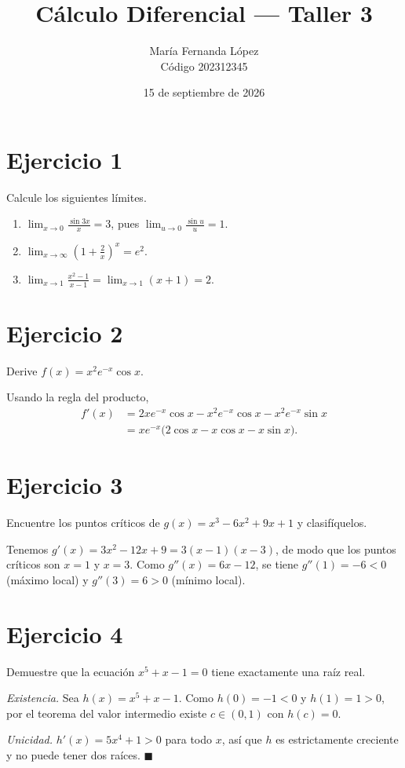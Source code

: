 \documentclass[11pt]{article}
\title{Cálculo Diferencial --- Taller 3}
\author{María Fernanda López \\ Código 202312345}
\date{15 de septiembre de 2026}
\begin{document}
\maketitle

\section*{Ejercicio 1}
Calcule los siguientes límites.
\begin{enumerate}[label=\alph*)]
  \item $\displaystyle\lim_{x\to 0} \frac{\sin 3x}{x} = 3$, pues $\lim_{u\to0}\frac{\sin u}{u}=1$.
  \item $\displaystyle\lim_{x\to\infty} \left(1+\frac{2}{x}\right)^{x} = e^{2}$.
  \item $\displaystyle\lim_{x\to 1} \frac{x^2-1}{x-1} = \lim_{x\to1}(x+1) = 2$.
\end{enumerate}

\section*{Ejercicio 2}
Derive $f(x) = x^2 e^{-x}\cos x$.

Usando la regla del producto,
\begin{align*}
f'(x) &= 2x e^{-x}\cos x - x^2 e^{-x}\cos x - x^2 e^{-x}\sin x \\
      &= x e^{-x}\bigl(2\cos x - x\cos x - x\sin x\bigr).
\end{align*}

\section*{Ejercicio 3}
Encuentre los puntos críticos de $g(x) = x^3 - 6x^2 + 9x + 1$ y clasifíquelos.

Tenemos $g'(x) = 3x^2 - 12x + 9 = 3(x-1)(x-3)$, de modo que los puntos críticos
son $x=1$ y $x=3$. Como $g''(x) = 6x - 12$, se tiene $g''(1) = -6 < 0$ (máximo local)
y $g''(3) = 6 > 0$ (mínimo local).

\section*{Ejercicio 4}
Demuestre que la ecuación $x^5 + x - 1 = 0$ tiene exactamente una raíz real.

\emph{Existencia.} Sea $h(x) = x^5+x-1$. Como $h(0)=-1<0$ y $h(1)=1>0$, por el
teorema del valor intermedio existe $c\in(0,1)$ con $h(c)=0$.

\emph{Unicidad.} $h'(x) = 5x^4+1>0$ para todo $x$, así que $h$ es estrictamente
creciente y no puede tener dos raíces. \hfill$\blacksquare$
\end{document}

